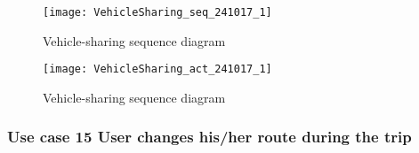\documentclass[a4paper,leqno]{book}
\begin{document}
\newpage
\begin{figure}[!h]
	\begin{center}
		\texttt{[image: VehicleSharing\_seq\_241017\_1]}
	\end{center}
	\caption{Vehicle-sharing sequence diagram}
\end{figure}

\begin{figure}[!h]
	\begin{center}
		\texttt{[image: VehicleSharing\_act\_241017\_1]}
	\end{center}
	\caption{Vehicle-sharing sequence diagram}
\end{figure}

\newpage
\subsubsection{Use case 15 User changes his/her route during the trip}
\end{document}
